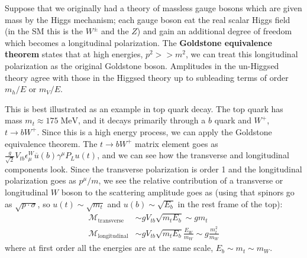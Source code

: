 \documentclass[11pt, oneside]{article}   	%
\theoremstyle{definition}
\numberwithin{equation}{subsection}		%
\begin{document}
Suppose that we originally had a theory of massless gauge bosons which are given mass by the Higgs mechanism; each gauge boson 
eat the real scalar Higgs field (in the SM this is the $W^\pm$ and the $Z$) and gain an additional degree of freedom which becomes 
a longitudinal polarization. The \textbf{Goldstone equivalence theorem} states that at high energies, $p^2 >> m^2$, we can treat 
this longitudinal polarization as the original Goldstone boson. Amplitudes in the un-Higgsed theory agree with those in the Higgsed 
theory up to subleading terms of order $m_h / E$ or $m_V / E$. 

This is best illustrated as an example in top quark decay. The top quark has mass $m_t\approx 175\;\mathrm{MeV}$, and it decays primarily 
through a $b$ quark and $W^+$, $t\rightarrow b W^+$. Since this is a high energy process, we can apply the Goldstone equivalence theorem. 
The $t\rightarrow b W^+$ matrix element goes as $\frac{g}{\sqrt 2} V_{tb} \epsilon_\mu^W \overline u(b) \gamma^\mu P_L u(t)$, and we can see 
how the transverse and longitudinal components look. Since the transverse polarization is order 1 and the longitudinal polarization goes as $p^\mu / m$, 
we see the relative contribution of a transverse or longitudinal $W$ boson to the scattering amplitude goes as (using that spinors go as $\sqrt{p\cdot\sigma}$, so 
$u(t)\sim \sqrt{m_t}$ and $u(b)\sim \sqrt{E_b}$ in the rest frame of the top):
\begin{align}
	\mathcal M_{\mathrm{transverse}}&\sim g V_{tb} \sqrt{m_t E_b}\sim g m_t \\
	\mathcal M_{\mathrm{longitudinal}}&\sim g V_{tb} \sqrt{m_t E_b} \frac{E_W}{m_W}\sim g \frac{m_t^2}{m_W}
\end{align}
where at first order all the energies are at the same scale, $E_b\sim m_t\sim m_W$. 
\end{document}
